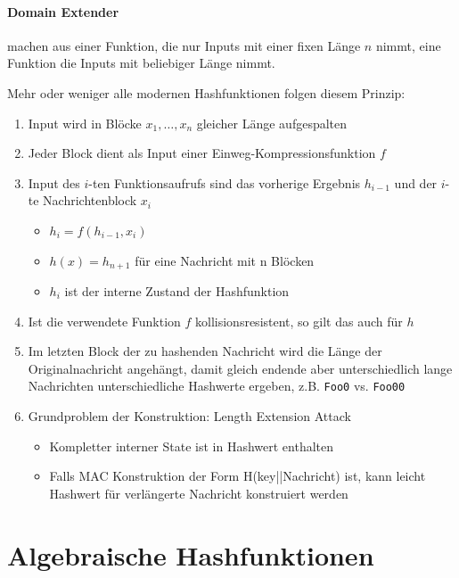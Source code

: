 \paragraph{Domain Extender} machen aus einer Funktion, die nur Inputs mit einer fixen Länge $n$ nimmt, eine 
Funktion die Inputs mit beliebiger Länge nimmt. 

Mehr oder weniger alle modernen Hashfunktionen folgen diesem Prinzip:

\begin{enumerate}
    \item Input wird in Blöcke $x_1, \ldots, x_n$ gleicher Länge aufgespalten
    \item Jeder Block dient als Input einer Einweg-Kompressionsfunktion $f$
    \item Input des $i$-ten Funktionsaufrufs sind das vorherige Ergebnis $h_{i-1}$ und der $i$-te Nachrichtenblock $x_i$
    \begin{itemize}
        \item $h_i = f(h_{i-1}, x_i)$
        \item $h(x) = h_{n+1}$ für eine Nachricht mit {n} Blöcken
        \item $h_i$ ist der interne Zustand der Hashfunktion
    \end{itemize}
    \item Ist die verwendete Funktion $f$ kollisionsresistent, so gilt das auch für $h$
    \item Im letzten Block der zu hashenden Nachricht wird die Länge der Originalnachricht angehängt, damit gleich endende aber unterschiedlich lange Nachrichten 
    unterschiedliche Hashwerte ergeben, z.B. \verb|Foo0| vs. \verb|Foo00|
    \item Grundproblem der Konstruktion: Length Extension Attack
    \begin{itemize}
        \item Kompletter interner State ist in Hashwert enthalten
        \item Falls MAC Konstruktion der Form H(key||Nachricht) ist, kann leicht Hashwert für verlängerte Nachricht konstruiert werden
    \end{itemize}
\end{enumerate}

\section{Algebraische Hashfunktionen}

